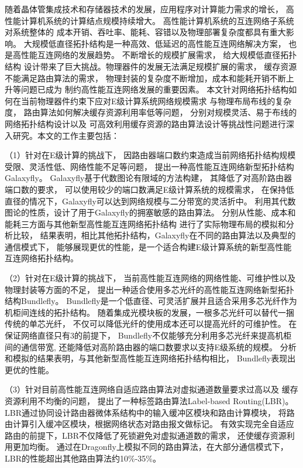 \begin{cabstract}
  随着晶体管集成技术和存储器技术的发展，应用程序对计算能力需求的增长，
  高性能计算机系统的计算结点规模持续增大。
  高性能计算机系统的互连网络子系统对系统整体的
  成本开销、吞吐率、能耗、容错以及物理部署复杂度都具有重大影响。
  大规模低直径拓扑结构是一种高效、低延迟的高性能互连网络解决方案，
  也是高性能互连网络的发展趋势。
  不断增长的规模扩展需求，
  给大规模低直径拓扑结构
  设计带来了巨大挑战。物理器件的发展无法满足规模扩展的需求，
  缓存资源不能满足路由算法的需求，
  物理封装的复杂度不断增加，成本和能耗开销不断上升等问题已成为
  制约高性能互连网络发展的重要因素。
  本文针对网络拓扑结构如何在当前物理器件约束下应对E级计算系统网络规模需求
  与物理布局布线的复杂度，
  路由算法如何解决缓存资源利用率低等问题，
  分别对规模灵活、易于布线的网络拓扑结构设计以及
  可高效利用缓存资源的路由算法设计等挑战性问题进行深入研究。本文的工作主要包括：

  （1）针对在E级计算的挑战下，
  因路由器端口数约束造成当前网络拓扑结构规模受限、灵活性低、网络性能不足等问题，
  提出一种高性能互连网络新型拓扑结构Galaxyfly。
  Galaxyfly基于代数图论有限域的方法构建，
  其降低了对高阶路由器端口数的要求，
  可以使用较少的端口数满足E级计算系统的规模需求，
  在保持低直径的情况下，Galaxyfly可以达到网络规模与二分带宽的灵活折中。
  利用其代数图论的性质，设计了用于Galaxyfly的拥塞敏感的路由算法。
  分别从性能、成本和能耗三方面与其他新型高性能互连网络拓扑结构
  进行了实际物理布局的模拟和分析比较，
  结果表明，相比其他拓扑结构，Galaxyfly在不同的路由算法以及典型的通信模式下，
  能够展现更优的性能，是一个适合构建E级计算系统的新型高性能互连网络拓扑结构。

  （2）针对在E级计算的挑战下，
  当前高性能互连网络的网络性能、可维护性以及物理封装等方面的不足，
  提出一种适合使用多芯光纤的高性能互连网络新型拓扑结构Bundlefly。
  Bundlefly是一个低直径、可灵活扩展并且适合采用多芯光纤作为机柜间连线的拓扑结构。
  随着集成光模块板的发展，一根多芯光纤可以替代一捆传统的单芯光纤，
  不仅可以降低光纤的使用成本还可以提高光纤的可维护性。
  在保证网络直径只有3的前提下，
  Bundlefly不仅能够充分利用多芯光纤来提高机柜间的通信带宽,
  还能降低对高阶路由器的端口数要求以支持E级系统的规模。
  分析和模拟的结果表明，与其他新型高性能互连网络拓扑结构相比，
  Bundlefly表现出更优的性能。

  （3）针对目前高性能互连网络自适应路由算法对虚拟通道数量要求过高以及
  缓存资源利用不均衡的问题，
  提出了一种标签路由算法Label-based Routing(LBR)。
  LBR通过协同设计路由器微体系结构中的输入缓冲区模块和路由计算模块，
  将路由计算引入缓冲区模块，根据网络状态对路由报文做标记。
  有效实现完全自适应路由的前提下，LBR不仅降低了死锁避免对虚拟通道数的需求，
  还使缓存资源利用更加均衡。
  通过在Dragonfly上模拟不同的路由算法，在大部分通信模式下，
  LBR的性能超出其他路由算法约10\%-35\%。



\end{cabstract}

